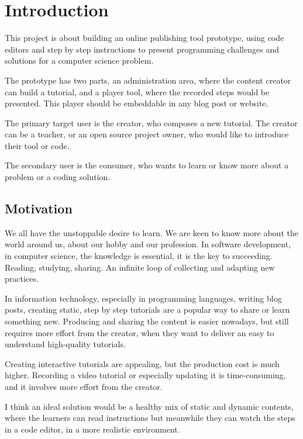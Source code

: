 \section{Introduction}\label{introduction}

This project is about building an online publishing tool prototype,
using code editors and step by step instructions to present programming
challenges and solutions for a computer science problem.

The prototype has two parts, an administration area, where the content
creator can build a tutorial, and a player tool, where the recorded
steps would be presented. This player should be embeddable in any blog
post or website.

The primary target user is the creator, who composes a new tutorial. The
creator can be a teacher, or an open source project owner, who would
like to introduce their tool or code.

The secondary user is the consumer, who wants to learn or know more
about a problem or a coding solution.

\subsection{Motivation}\label{motivation}

We all have the unstoppable desire to learn. We are keen to know more
about the world around us, about our hobby and our profession. In
software development, in computer science, the knowledge is essential,
it is the key to succeeding. Reading, studying, sharing. An infinite
loop of collecting and adapting new practices.

In information technology, especially in programming languages, writing
blog posts, creating static, step by step tutorials are a popular way to
share or learn something new. Producing and sharing the content is
easier nowadays, but still requires more effort from the creator, when
they want to deliver an easy to understand high-quality tutorials.

Creating interactive tutorials are appealing, but the production cost is
much higher. Recording a video tutorial or especially updating it is
time-consuming, and it involves more effort from the creator.

I think an ideal solution would be a healthy mix of static and dynamic
contents, where the learners can read instructions but meanwhile they
can watch the steps in a code editor, in a more realistic environment.

